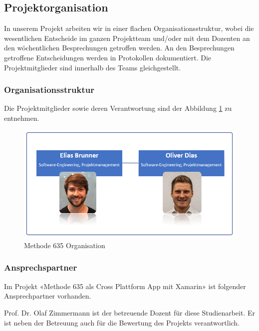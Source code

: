 \subsection{Projektorganisation}
In unserem Projekt arbeiten wir in einer flachen Organisationsstruktur, wobei die wesentlichen Entscheide im ganzen Projektteam und/oder mit dem Dozenten an den wöchentlichen Besprechungen getroffen werden. An den Besprechungen getroffene Entscheidungen werden in Protokollen dokumentiert. Die Projektmitglieder sind innerhalb des Teams gleichgestellt.

\subsubsection*{Organisationsstruktur}
Die Projektmitglieder sowie deren Verantwortung sind der Abbildung \ref{fig:organisation} zu entnehmen.
\begin{figure}[h]
	\centering
	\includegraphics[width=1\linewidth]{img/projekt-plan/organisation}
	\caption[Organisation Methode 635]{Methode 635 Organisation}
	\label{fig:organisation}
\end{figure}


\subsubsection*{Ansprechspartner}
Im Projekt «Methode 635 als Cross Plattform App mit Xamarin» ist folgender Ansprechpartner vorhanden.

\begin{description}[leftmargin=!,labelwidth=\widthof{\bfseries Betreuer}]
	\item[Betreuer] Prof. Dr. Olaf Zimmermann ist der betreuende Dozent für diese Studienarbeit. Er ist neben der Betreuung auch für die Bewertung des Projekts verantwortlich. 
\end{description}

